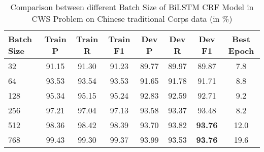 \begin{table*}[htbp!]
    \centering
    \begin{tabular}{lccccccc}
    \midrule
    Batch Size  &  Train P          & Train R        & Train F1       & Dev P      & Dev R & Dev F1 &Best Epoch\\
    \midrule
    32         & 91.15   & 91.30   & 91.23    & 89.77 & 89.97 & 89.87     & 7.8        \\
    64         & 93.53   & 93.54   & 93.53    & 91.65 & 91.78 & 91.71     & 8.8        \\
    128        & 95.34   & 95.15   & 95.24    & 92.83 & 92.59 & 92.71     & 9.2        \\
    256        & 97.21   & 97.04   & 97.13    & 93.58 & 93.37 & 93.48     & 8.2        \\
    512        & 98.36   & 98.42   & 98.39    & 93.70 & 93.82 & \bf93.76  & 12.0       \\
    768        & 99.43   & 99.30   & 99.37    & 93.99 & 93.53 & \bf93.76  & 19.6       \\

    \bottomrule
    \end{tabular}
\caption{Comparison between different Batch Size of BiLSTM CRF Model in CWS Problem on Chinese traditional Corps data (in \%)}
\label{tab:batchSize}
\end{table*}
